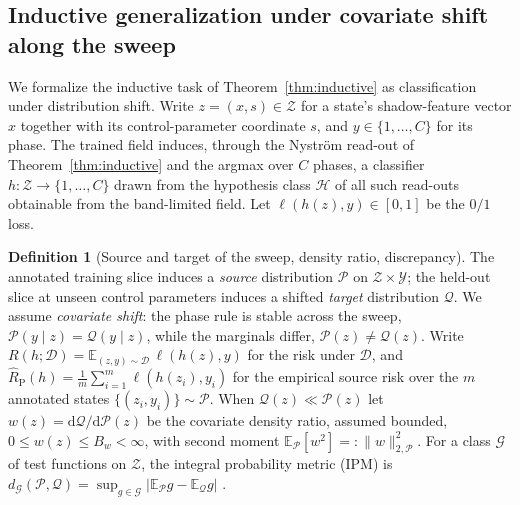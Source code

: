 \documentclass[aps,prresearch,reprint,amsmath,amssymb,nofootinbib,superscriptaddress,floatfix]{revtex4-2}
\theoremstyle{definition}
\newtheorem{definition}[theorem]{Definition}
\theoremstyle{remark}
\theoremstyle{plain}
\begin{document}
\subsection{Inductive generalization under covariate shift along the sweep}
\label{ssub:covshift}
We formalize the inductive task of Theorem~\ref{thm:inductive} as classification under distribution shift.
Write $z=(x,s)\in\mathcal Z$ for a state's shadow-feature vector $x$ together with its control-parameter
coordinate $s$, and $y\in\{1,\dots,C\}$ for its phase. The trained field induces, through the Nystr\"om
read-out of Theorem~\ref{thm:inductive} and the argmax over $C$ phases, a classifier
$h:\mathcal Z\to\{1,\dots,C\}$ drawn from the hypothesis class $\mathcal H$ of all such read-outs obtainable
from the band-limited field. Let $\ell(h(z),y)\in[0,1]$ be the $0/1$ loss.

\begin{definition}[Source and target of the sweep, density ratio, discrepancy]
\label{def:distributions}
The annotated training slice induces a \emph{source} distribution $\mathcal P$ on $\mathcal Z\times\mathcal
Y$; the held-out slice at unseen control parameters induces a shifted \emph{target} distribution $\mathcal
Q$. We assume \emph{covariate shift}: the phase rule is stable across the sweep, $\mathcal
P(y\mid z)=\mathcal Q(y\mid z)$, while the marginals differ, $\mathcal P(z)\neq\mathcal Q(z)$. Write
$R(h;\mathcal D)=\mathbb E_{(z,y)\sim\mathcal D}\,\ell(h(z),y)$ for the risk under $\mathcal D$, and
$\widehat R_{\mathrm P}(h)=\tfrac1m\sum_{i=1}^m\ell(h(z_i),y_i)$ for the empirical source risk over the $m$
annotated states $\{(z_i,y_i)\}\sim\mathcal P$. When $\mathcal Q(z)\ll\mathcal P(z)$ let
$w(z)=\mathrm d\mathcal Q/\mathrm d\mathcal P(z)$ be the covariate density ratio, assumed bounded,
$0\le w(z)\le B_w<\infty$, with second moment $\mathbb E_{\mathcal P}[w^2]=:\|w\|_{2,\mathcal P}^2$. For a
class $\mathcal G$ of test functions on $\mathcal Z$, the integral probability metric (IPM) is
$d_{\mathcal G}(\mathcal P,\mathcal Q)=\sup_{g\in\mathcal G}\big|\mathbb E_{\mathcal P}g-\mathbb
E_{\mathcal Q}g\big|$ \cite{sriperumbudur2012empirical}.
\end{definition}
\end{document}

